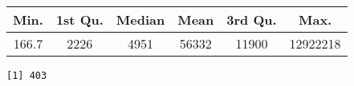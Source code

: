 \documentclass[]{book}
\newenvironment{Shaded}{\begin{snugshade}}{\end{snugshade}}
\newcommand{\KeywordTok}[1]{\textcolor[rgb]{0.13,0.29,0.53}{\textbf{#1}}}
\newcommand{\DecValTok}[1]{\textcolor[rgb]{0.00,0.00,0.81}{#1}}
\newcommand{\OperatorTok}[1]{\textcolor[rgb]{0.81,0.36,0.00}{\textbf{#1}}}
\newcommand{\NormalTok}[1]{#1}
\theoremstyle{definition}
\theoremstyle{definition}
\theoremstyle{definition}
\theoremstyle{remark}
\begin{document}
\begin{longtable}[]{@{}cccccc@{}}
\toprule
\begin{minipage}[b]{0.09\columnwidth}\centering\strut
Min.\strut
\end{minipage} & \begin{minipage}[b]{0.12\columnwidth}\centering\strut
1st Qu.\strut
\end{minipage} & \begin{minipage}[b]{0.10\columnwidth}\centering\strut
Median\strut
\end{minipage} & \begin{minipage}[b]{0.09\columnwidth}\centering\strut
Mean\strut
\end{minipage} & \begin{minipage}[b]{0.12\columnwidth}\centering\strut
3rd Qu.\strut
\end{minipage} & \begin{minipage}[b]{0.12\columnwidth}\centering\strut
Max.\strut
\end{minipage}\tabularnewline
\midrule
\endhead
\begin{minipage}[t]{0.09\columnwidth}\centering\strut
166.7\strut
\end{minipage} & \begin{minipage}[t]{0.12\columnwidth}\centering\strut
2226\strut
\end{minipage} & \begin{minipage}[t]{0.10\columnwidth}\centering\strut
4951\strut
\end{minipage} & \begin{minipage}[t]{0.09\columnwidth}\centering\strut
56332\strut
\end{minipage} & \begin{minipage}[t]{0.12\columnwidth}\centering\strut
11900\strut
\end{minipage} & \begin{minipage}[t]{0.12\columnwidth}\centering\strut
12922218\strut
\end{minipage}\tabularnewline
\bottomrule
\end{longtable}

\begin{Shaded}
\end{Shaded}

\begin{verbatim}
[1] 403
\end{verbatim}
\end{document}
